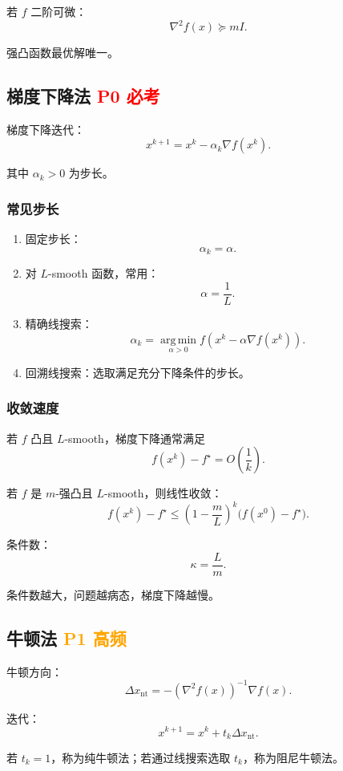 \documentclass[11pt,a4paper]{ctexart}
\newcommand{\argmin}{\operatorname*{arg\,min}}
\newcommand{\Pzero}{\textcolor{red}{\textbf{P0 必考}}}
\newcommand{\Pone}{\textcolor{orange}{\textbf{P1 高频}}}
\theoremstyle{definition}
\theoremstyle{plain}
\theoremstyle{remark}
\begin{document}
若 $f$ 二阶可微：
\[
    \nabla^2 f(x)\succeq mI.
\]

强凸函数最优解唯一。

\subsection{梯度下降法 \Pzero}

梯度下降迭代：
\[
    x^{k+1}=x^k-\alpha_k\nabla f(x^k).
\]

其中 $\alpha_k>0$ 为步长。

\subsubsection*{常见步长}

\begin{enumerate}[label=\arabic*.]
    \item 固定步长：
    \[
        \alpha_k=\alpha.
    \]
    \item 对 $L$-smooth 函数，常用：
    \[
        \alpha=\frac1L.
    \]
    \item 精确线搜索：
    \[
        \alpha_k=\argmin_{\alpha>0} f(x^k-\alpha\nabla f(x^k)).
    \]
    \item 回溯线搜索：选取满足充分下降条件的步长。
\end{enumerate}

\subsubsection*{收敛速度}

若 $f$ 凸且 $L$-smooth，梯度下降通常满足
\[
    f(x^k)-f^\star=O\left(\frac1k\right).
\]

若 $f$ 是 $m$-强凸且 $L$-smooth，则线性收敛：
\[
    f(x^k)-f^\star
    \le
    \left(1-\frac{m}{L}\right)^k
    \bigl(f(x^0)-f^\star\bigr).
\]

条件数：
\[
    \kappa=\frac{L}{m}.
\]

条件数越大，问题越病态，梯度下降越慢。

\subsection{牛顿法 \Pone}

牛顿方向：
\[
    \Delta x_{\mathrm{nt}}
    =
    -\left(\nabla^2 f(x)\right)^{-1}\nabla f(x).
\]

迭代：
\[
    x^{k+1}=x^k+t_k\Delta x_{\mathrm{nt}}.
\]

若 $t_k=1$，称为纯牛顿法；若通过线搜索选取 $t_k$，称为阻尼牛顿法。
\end{document}
